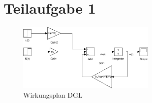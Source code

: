 \section{Teilaufgabe 1}
\begin{figure}[h!]
    \centering
    \includegraphics[width=0.6\textwidth]{01/wirkungsplan.pdf}
    \caption{Wirkungsplan DGL}
    \label{fig:01}
\end{figure}
